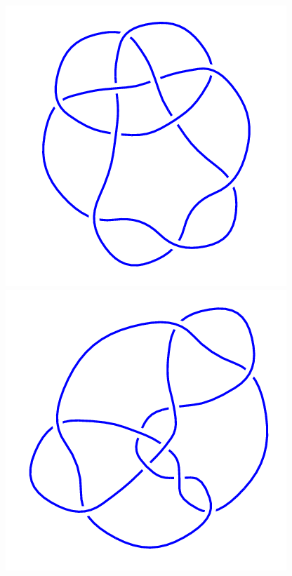 \begin{figure}[H]
\begin{minipage}[b]{.18\linewidth}
	\end{minipage}
	\begin{minipage}[b]{.18\linewidth}
		\centering
		\includegraphics[width=\linewidth]{../data/10_159.png}
	\end{minipage}
	\begin{minipage}[b]{.18\linewidth}
		\centering
		\includegraphics[width=\linewidth]{../data/10_160.png}

\end{minipage}
\end{figure}
